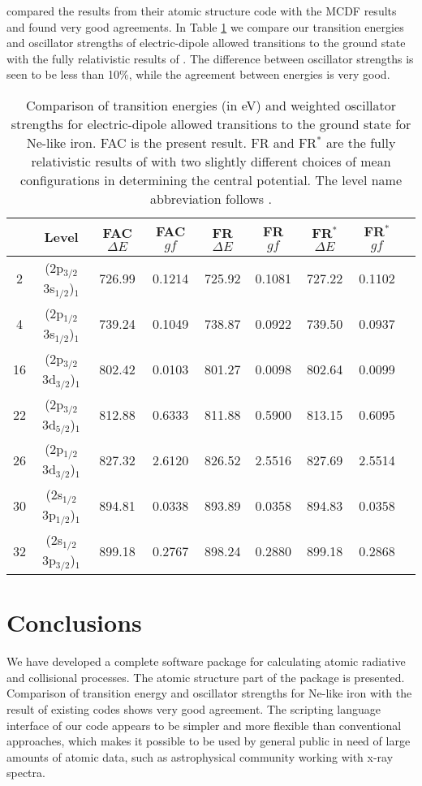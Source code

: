 \documentclass{elsart}
\begin{document}
\citet{sampson89} compared the results from their atomic structure
code with the MCDF results and found very good agreements. In Table
\ref{tab_comparison} we 
compare our transition energies and oscillator strengths of electric-dipole
allowed transitions to the ground state with
the fully relativistic results of \citet{sampson89}. The difference between
oscillator strengths is seen to be less than 10\%, while the agreement between
energies is very good.

\begin{table}
\caption{\label{tab_comparison} Comparison of transition energies (in eV) and
weighted oscillator strengths for electric-dipole allowed transitions to the
ground state for Ne-like iron. FAC is the present result. FR and FR$^*$ are
the fully relativistic results of \citet{sampson89} with two slightly
different choices of mean configurations in determining the central
potential. The level name abbreviation follows \citet{sampson89}.}

\begin{tabular}{ccccccccc}
\hline\hline
 & Level & FAC $\Delta E$ & FAC $gf$ & 
FR $\Delta E$ & FR $gf$ & FR$^*$ $\Delta E$ & FR$^*$ $gf$ \\
\hline
2 & (2p$_{3/2}$3s$_{1/2}$)$_{1}$ & 726.99 & 0.1214 & 725.92 & 0.1081 & 727.22 & 0.1102 \\
4 & (2p$_{1/2}$3s$_{1/2}$)$_{1}$ & 739.24 & 0.1049 & 738.87 & 0.0922 & 739.50 & 0.0937 \\
16 & (2p$_{3/2}$3d$_{3/2}$)$_{1}$ &802.42 & 0.0103 & 801.27 & 0.0098 & 802.64 & 0.0099 \\
22 & (2p$_{3/2}$3d$_{5/2}$)$_{1}$ &812.88 & 0.6333 & 811.88 & 0.5900 & 813.15 & 0.6095 \\
26 & (2p$_{1/2}$3d$_{3/2}$)$_{1}$ &827.32 & 2.6120 & 826.52 & 2.5516 & 827.69 & 2.5514 \\
30 & (2s$_{1/2}$3p$_{1/2}$)$_{1}$ &894.81 & 0.0338 & 893.89 & 0.0358 & 894.83 & 0.0358 \\
32 & (2s$_{1/2}$3p$_{3/2}$)$_{1}$ &899.18 & 0.2767 & 898.24 & 0.2880 & 899.18 & 0.2868 \\
\hline\hline
\end{tabular}
\end{table}

\section{Conclusions}
We have developed a complete software package for calculating atomic radiative
and collisional processes. The atomic structure part of the package is
presented. Comparison of transition energy and oscillator strengths for
Ne-like iron with the result of existing codes shows very good agreement. The
scripting language interface of our code appears to be simpler and more
flexible than conventional approaches, which makes it possible to be used by
general public in need of large amounts of atomic data, such as astrophysical
community working with x-ray spectra. 
\end{document}
